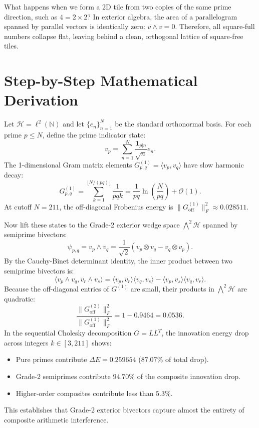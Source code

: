 \documentclass[11pt,a4paper]{article}
\theoremstyle{definition}
\begin{document}
What happens when we form a 2D tile from two copies of the same prime direction, such as $4 = 2 \times 2$? In exterior algebra, the area of a parallelogram spanned by parallel vectors is identically zero: $v \wedge v = 0$. Therefore, all square-full numbers collapse flat, leaving behind a clean, orthogonal lattice of square-free tiles.


\section{Step-by-Step Mathematical Derivation}

Let $\mathcal{H} = \ell^2(\mathbb{N})$ and let $\{e_n\}_{n=1}^N$ be the standard orthonormal basis. For each prime $p \le N$, define the prime indicator state:
\begin{equation}
v_p = \sum_{n=1}^N \frac{\mathbf{1}_{p|n}}{\sqrt{n}} e_n.
\end{equation}
The 1-dimensional Gram matrix elements $G_{p, q}^{(1)} = \langle v_p, v_q \rangle$ have slow harmonic decay:
\begin{equation}
G_{p, q}^{(1)} = \sum_{k=1}^{\lfloor N / (pq) \rfloor} \frac{1}{pq k} = \frac{1}{pq} \ln\left(\frac{N}{pq}\right) + \mathcal{O}(1).
\end{equation}
At cutoff $N = 211$, the off-diagonal Frobenius energy is $\|G_{\mathrm{off}}^{(1)}\|_F^2 \approx 0.028511$.

Now lift these states to the Grade-2 exterior wedge space $\bigwedge^2 \mathcal{H}$ spanned by semiprime bivectors:
\begin{equation}
\psi_{p, q} = v_p \wedge v_q = \frac{1}{\sqrt{2}} (v_p \otimes v_q - v_q \otimes v_p).
\end{equation}
By the Cauchy-Binet determinant identity, the inner product between two semiprime bivectors is:
\begin{equation}
\langle v_p \wedge v_q, v_r \wedge v_s \rangle = \langle v_p, v_r \rangle \langle v_q, v_s \rangle - \langle v_p, v_s \rangle \langle v_q, v_r \rangle.
\end{equation}
Because the off-diagonal entries of $G^{(1)}$ are small, their products in $\bigwedge^2 \mathcal{H}$ are quadratic:
\begin{equation}
\frac{\|G_{\mathrm{off}}^{(2)}\|_F^2}{\|G_{\mathrm{off}}^{(1)}\|_F^2} = 1 - 0.9464 = 0.0536.
\end{equation}
In the sequential Cholesky decomposition $G = L L^T$, the innovation energy drop across integers $k \in [3, 211]$ shows:
\begin{itemize}
\item Pure primes contribute $\Delta E = 0.259654$ ($87.07\%$ of total drop).
\item Grade-2 semiprimes contribute $94.70\%$ of the composite innovation drop.
\item Higher-order composites contribute less than $5.3\%$.
\end{itemize}
This establishes that Grade-2 exterior bivectors capture almost the entirety of composite arithmetic interference.
\end{document}
